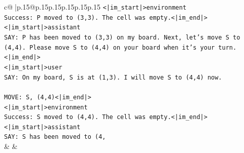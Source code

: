 \documentclass{article}
\begin{document}
{\begin{supertabular}{c@{$\;$}|p{.15\linewidth}@{}p{.15\linewidth}p{.15\linewidth}p{.15\linewidth}p{.15\linewidth}p{.15\linewidth}}
{{{\texttt{<|im\_start|>environment} \\
\texttt{Success: P moved to (3,3). The cell was empty.<|im\_end|>} \\
\texttt{<|im\_start|>assistant} \\
\texttt{SAY: P has been moved to (3,3) on my board. Next, let's move S to (4,4). Please move S to (4,4) on your board when it's your turn.<|im\_end|>} \\
\texttt{<|im\_start|>user} \\
\texttt{SAY: On my board, S is at (1,3). I will move S to (4,4) now.} \\
\\ 
\texttt{MOVE: S, (4,4)<|im\_end|>} \\
\texttt{<|im\_start|>environment} \\
\texttt{Success: S moved to (4,4). The cell was empty.<|im\_end|>} \\
\texttt{<|im\_start|>assistant} \\
\texttt{SAY: S has been moved to (4,} \\
            }
        }
    }
    & & \\ \\


\end{supertabular}}
\end{document}
